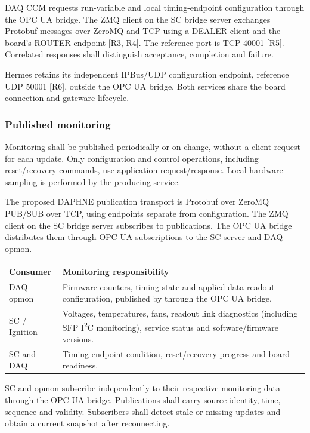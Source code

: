 DAQ CCM requests run-variable and local timing-endpoint configuration through the
OPC UA bridge. The ZMQ client on the SC bridge server exchanges Protobuf
messages over ZeroMQ and TCP using a DEALER client and the board's ROUTER
endpoint [R3, R4].
The reference port is TCP 40001 [R5]. Correlated responses shall distinguish
acceptance, completion and failure.

Hermes retains its independent IPBus/UDP configuration endpoint, reference
UDP 50001 [R6], outside the OPC UA bridge. Both services share the board
connection and gateware lifecycle.

\subsubsection{Published monitoring}

Monitoring shall be published periodically or on change, without a client
request for each update. Only configuration and control operations, including
reset/recovery commands, use application request/response. Local hardware
sampling is performed by the producing service.

The proposed DAPHNE publication transport is Protobuf over ZeroMQ PUB/SUB over TCP,
using endpoints separate from configuration. The ZMQ client on the SC bridge
server subscribes to  publications. The OPC UA bridge
distributes them through OPC UA subscriptions to the SC server and DAQ opmon.

\begin{center}\small
\begin{tabular}{L{0.25\textwidth}L{0.68\textwidth}}
\toprule
\textbf{Consumer} & \textbf{Monitoring responsibility} \\
\midrule
DAQ opmon & Firmware counters, timing state and applied data-readout configuration, published by  through the OPC UA bridge. \\
SC / Ignition & Voltages, temperatures, fans, readout link diagnostics (including SFP I\textsuperscript{2}C monitoring), service status and software/firmware versions. \\
SC and DAQ & Timing-endpoint condition, reset/recovery progress and board readiness. \\
\bottomrule
\end{tabular}
\end{center}

SC and opmon subscribe independently to their respective monitoring data
through the OPC UA bridge. Publications shall carry source identity, time,
sequence and validity. Subscribers shall detect
stale or missing updates and obtain a current snapshot after reconnecting.

